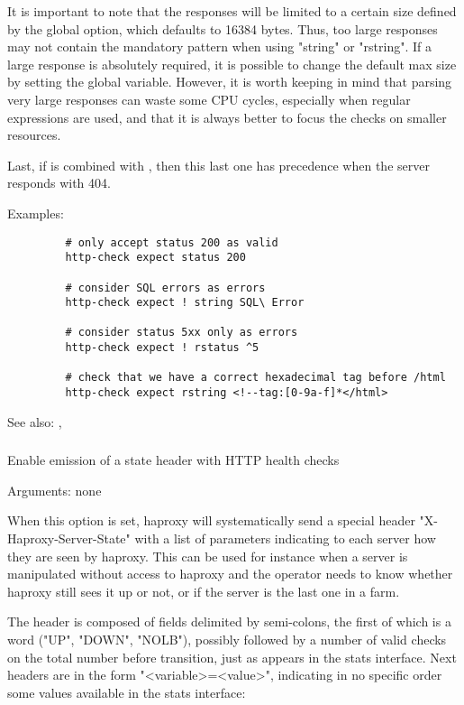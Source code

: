   It is important to note that the responses will be limited to a certain size
  defined by the global  option, which defaults to 16384 bytes.
  Thus, too large responses may not contain the mandatory pattern when using
  "string" or "rstring". If a large response is absolutely required, it is
  possible to change the default max size by setting the global variable.
  However, it is worth keeping in mind that parsing very large responses can
  waste some CPU cycles, especially when regular expressions are used, and that
  it is always better to focus the checks on smaller resources.

  Last, if  is combined with ,
  then this last one has precedence when the server responds with 404.

  Examples:
  \begin{verbatim}
         # only accept status 200 as valid
         http-check expect status 200

         # consider SQL errors as errors
         http-check expect ! string SQL\ Error

         # consider status 5xx only as errors
         http-check expect ! rstatus ^5

         # check that we have a correct hexadecimal tag before /html
         http-check expect rstring <!--tag:[0-9a-f]*</html>
  \end{verbatim}


See also: , 

\subsubsection[http-check send-state]{}

  Enable emission of a state header with HTTP health checks
  
  
  Arguments: none

  When this option is set, haproxy will systematically send a special header
  "X-Haproxy-Server-State" with a list of parameters indicating to each server
  how they are seen by haproxy. This can be used for instance when a server is
  manipulated without access to haproxy and the operator needs to know whether
  haproxy still sees it up or not, or if the server is the last one in a farm.

  The header is composed of fields delimited by semi-colons, the first of which
  is a word ("UP", "DOWN", "NOLB"), possibly followed by a number of valid
  checks on the total number before transition, just as appears in the stats
  interface. Next headers are in the form "<variable>=<value>", indicating in
  no specific order some values available in the stats interface:
  
